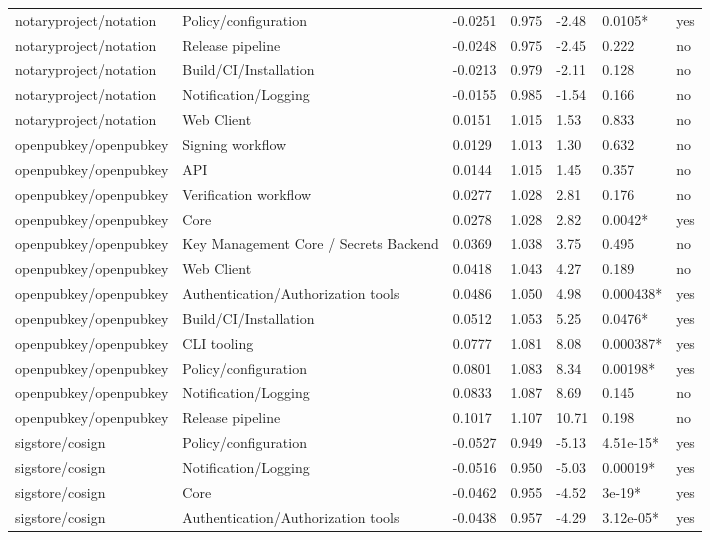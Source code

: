 \begin{table}[t]
\begin{tabular}{lllllll}
notaryproject/notation & Policy/configuration & -0.0251 & 0.975 & -2.48 & 0.0105* & yes \\
notaryproject/notation & Release pipeline & -0.0248 & 0.975 & -2.45 & 0.222 & no \\
notaryproject/notation & Build/CI/Installation & -0.0213 & 0.979 & -2.11 & 0.128 & no \\
notaryproject/notation & Notification/Logging & -0.0155 & 0.985 & -1.54 & 0.166 & no \\
notaryproject/notation & Web Client & 0.0151 & 1.015 & 1.53 & 0.833 & no \\
openpubkey/openpubkey & Signing workflow & 0.0129 & 1.013 & 1.30 & 0.632 & no \\
openpubkey/openpubkey & API & 0.0144 & 1.015 & 1.45 & 0.357 & no \\
openpubkey/openpubkey & Verification workflow & 0.0277 & 1.028 & 2.81 & 0.176 & no \\
openpubkey/openpubkey & Core & 0.0278 & 1.028 & 2.82 & 0.0042* & yes \\
openpubkey/openpubkey & Key Management Core / Secrets Backend & 0.0369 & 1.038 & 3.75 & 0.495 & no \\
openpubkey/openpubkey & Web Client & 0.0418 & 1.043 & 4.27 & 0.189 & no \\
openpubkey/openpubkey & Authentication/Authorization tools & 0.0486 & 1.050 & 4.98 & 0.000438* & yes \\
openpubkey/openpubkey & Build/CI/Installation & 0.0512 & 1.053 & 5.25 & 0.0476* & yes \\
openpubkey/openpubkey & CLI tooling & 0.0777 & 1.081 & 8.08 & 0.000387* & yes \\
openpubkey/openpubkey & Policy/configuration & 0.0801 & 1.083 & 8.34 & 0.00198* & yes \\
openpubkey/openpubkey & Notification/Logging & 0.0833 & 1.087 & 8.69 & 0.145 & no \\
openpubkey/openpubkey & Release pipeline & 0.1017 & 1.107 & 10.71 & 0.198 & no \\
sigstore/cosign & Policy/configuration & -0.0527 & 0.949 & -5.13 & 4.51e-15* & yes \\
sigstore/cosign & Notification/Logging & -0.0516 & 0.950 & -5.03 & 0.00019* & yes \\
sigstore/cosign & Core & -0.0462 & 0.955 & -4.52 & 3e-19* & yes \\
sigstore/cosign & Authentication/Authorization tools & -0.0438 & 0.957 & -4.29 & 3.12e-05* & yes \\

\end{tabular}
\end{table}
